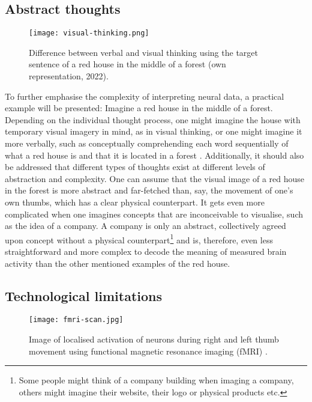 \subsection{Abstract thoughts}
\label{chapter2-abstract-thoughts}

\begin{figure}[ht]
  \centering
  \texttt{[image: visual-thinking.png]}
  \caption{Difference between verbal and visual thinking using the target sentence of a red house in the middle of a forest (own representation, 2022).}
  \label{fig:visual-thinking}
\end{figure}

To further emphasise the complexity of interpreting neural data, a practical example will be presented: Imagine a red house in the middle of a forest. Depending on the individual thought process, one might imagine the house with temporary visual imagery in mind, as in visual thinking, or one might imagine it more verbally, such as conceptually comprehending each word sequentially of what a red house is and that it is located in a forest \citep{amit_asymmetrical_2017}. Additionally, it should also be addressed that different types of thoughts exist at different levels of abstraction and complexity. One can assume that the visual image of a red house in the forest is more abstract and far-fetched than, say, the movement of one's own thumbs, which has a clear physical counterpart. It gets even more complicated when one imagines concepts that are inconceivable to visualise, such as the idea of a company. A company is only an abstract, collectively agreed upon concept without a physical counterpart\footnote{Some people might think of a company building when imaging a company, others might imagine their website, their logo or physical products etc.} and is, therefore, even less straightforward and more complex to decode the meaning of measured brain activity than the other mentioned examples of the red house.

\subsection{Technological limitations}
\label{chapter2-technological-limitations}

\begin{figure}[ht]
  \centering
  \texttt{[image: fmri-scan.jpg]}
  \caption{Image of localised activation of neurons during right and left thumb movement using functional magnetic resonance imaging (fMRI) \citep{rashid_bilateral_2018}.}
  \label{fig:fmri-scan}
\end{figure}

